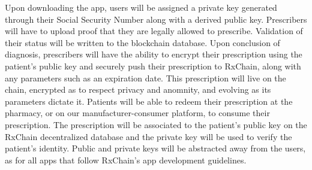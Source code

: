 Upon downloading the app, users will be assigned a private key generated through their Social Security Number
along with a derived public key.
Prescribers will have to upload proof that they are legally allowed to prescribe.
Validation of their status will be written to the blockchain database.
Upon conclusion of diagnosis, prescribers will have the ability to encrypt their prescription using the patient's public key
and securely push their prescription to RxChain, along with any parameters such as an expiration date.
This prescription will live on the chain, encrypted as to respect privacy and anomnity, and evolving as its parameters dictate it.
Patients will be able to redeem their prescription at the pharmacy, or on our manufacturer-consumer platform, to consume their prescription.
The prescription will be associated to the patient's public key on the RxChain decentralized database and the private key will be used to verify the patient's identity.
Public and private keys will be abstracted away from the users, as for all apps that follow RxChain's app development guidelines.





